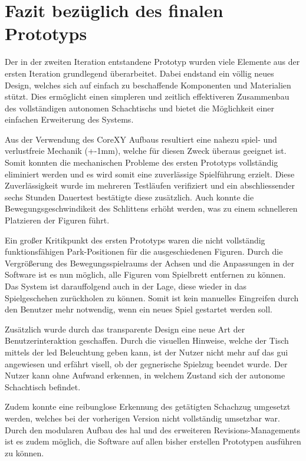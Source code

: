 \hypertarget{fazit-bezuxfcglich-des-finalen-prototyps}{%
\section{Fazit bezüglich des finalen
Prototyps}\label{fazit-bezuxfcglich-des-finalen-prototyps}}

Der in der zweiten Iteration entstandene Prototyp wurden viele Elemente
aus der ersten Iteration grundlegend überarbeitet. Dabei endstand ein
völlig neues Design, welches sich auf einfach zu beschaffende
Komponenten und Materialien stützt. Dies ermöglicht einen simpleren und
zeitlich effektiveren Zusammenbau des vollständigen autonomen
Schachtischs und bietet die Möglichkeit einer einfachen Erweiterung des
Systems.

Aus der Verwendung des CoreXY Aufbaus resultiert eine nahezu spiel- und
verlustfreie Mechanik (+-1mm), welche für diesen Zweck überaus geeignet
ist. Somit konnten die mechanischen Probleme des ersten Prototyps
vollständig eliminiert werden und es wird somit eine zuverlässige
Spielführung erzielt. Diese Zuverlässigkeit wurde im mehreren Testläufen
verifiziert und ein abschliessender sechs Stunden Dauertest bestätigte
diese zusätzlich. Auch konnte die Bewegungsgeschwindikeit des Schlittens
erhöht werden, was zu einem schnelleren Platzieren der Figuren führt.

Ein großer Kritikpunkt des ersten Prototyps waren die nicht vollständig
funktionsfähigen Park-Positionen für die ausgeschiedenen Figuren. Durch
die Vergrößerung des Bewegungsspielraums der Achsen und die Anpassungen
in der Software ist es nun möglich, alle Figuren vom Spielbrett
entfernen zu können. Das System ist darauffolgend auch in der Lage,
diese wieder in das Spielgeschehen zurückholen zu können. Somit ist kein
manuelles Eingreifen durch den Benutzer mehr notwendig, wenn ein neues
Spiel gestartet werden soll.

Zusätzlich wurde durch das transparente Design eine neue Art der
Benutzerinteraktion geschaffen. Durch die visuellen Hinweise, welche der
Tisch mittels der \gls{led} Beleuchtung geben kann, ist der Nutzer nicht
mehr auf das \gls{gui} angewiesen und erfährt visell, ob der gegnerische
Spielzug beendet wurde. Der Nutzer kann ohne Aufwand erkennen, in
welchem Zustand sich der autonome Schachtisch befindet.

Zudem konnte eine reibunglose Erkennung des getätigten Schachzug
umgesetzt werden, welches bei der vorherigen Version nicht vollständig
umsetzbar war. Durch den modularen Aufbau des \gls{hal} und des
erweiteren Revisions-Managements ist es zudem möglich, die Software auf
allen bisher erstellen Prototypen ausführen zu können.

